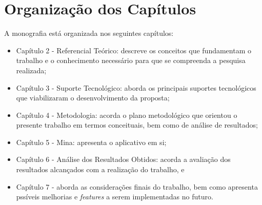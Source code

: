 \section{Organização dos Capítulos}

A monografia está organizada nos seguintes capítulos:

\begin{itemize}


        \item Capítulo 2 - Referencial Teórico: descreve os conceitos que fundamentam o trabalho e o conhecimento necessário para que se compreenda a pesquisa realizada;
        
        \item Capítulo 3 - Suporte Tecnológico: aborda os principais suportes tecnológicos que viabilizaram o desenvolvimento da proposta;
        
        \item Capítulo 4 - Metodologia: acorda o plano metodológico que orientou o presente trabalho em termos conceituais, bem como de análise de resultados;

        \item Capítulo 5 - Mina: apresenta o aplicativo em si;

        \item Capítulo 6 - Análise dos Resultados Obtidos: acorda a avaliação dos resultados alcançados com a realização do trabalho, e
        
        \item Capítulo 7 - aborda as considerações finais do trabalho, bem como apresenta pssíveis melhorias e \emph{features} a serem implementadas no futuro.

\end{itemize}